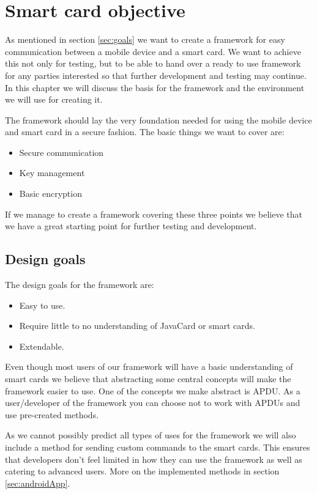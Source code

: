 \chapter{Smart card objective}
As mentioned in section \ref{sec:goals} we want to create a framework for easy communication between a mobile device and a smart card. We want to achieve this not only for testing, but to be able to hand over a ready to use framework for any parties interested so that further development and testing may continue. In this chapter we will discuss the basis for the framework and the environment we will use for creating it.

The framework should lay the very foundation needed for using the mobile device and smart card in a secure fashion. The basic things we want to cover are:
\begin{itemize}
    \item Secure communication
    \item Key management
    \item Basic encryption
\end{itemize}
If we manage to create a framework covering these three points we believe that we have a great starting point for further testing and development.

\section{Design goals}
\label{sec:designAndroidGoals}
The design goals for the framework are:

\begin{itemize}
    \item Easy to use.
    \item Require little to no understanding of JavaCard or smart cards.
    \item Extendable.
\end{itemize}

Even though most users of our framework will have a basic understanding of smart cards we believe that abstracting some central concepts will make the framework easier to use. One of the concepts we make abstract is APDU. As a user/developer of the framework you can choose not to work with APDUs and use pre-created methods.

As we cannot possibly predict all types of uses for the framework we will also include a method for sending custom commands to the smart cards. This ensures that developers don't feel limited in how they can use the framework as well as catering to advanced users. More on the implemented methods in section \ref{sec:androidApp}.

